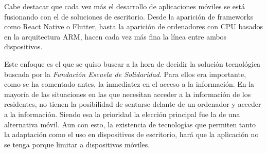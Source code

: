 Cabe destacar que cada vez más el desarrollo de aplicaciones móviles se está fusionando con el de soluciones de escritorio. Desde la aparición de frameworks como React Native o Flutter, hasta la aparición de ordenadores con CPU basados en la arquitectura ARM, hacen cada vez más fina la línea entre ambos dispositivos. 

Este enfoque es el que se quiso buscar a la hora de decidir la solución tecnológica buscada por la \textit{Fundación Escuela de Solidaridad}. Para ellos era importante, como se ha comentado antes, la inmediatez en el acceso a la información. En la mayoría de las situaciones en las que necesitan acceder a la información de los residentes, no tienen la posibilidad de sentarse delante de un ordenador y acceder a la información. Siendo esa la prioridad la elección principal fue la de una alternativa móvil. Aun con esto, la existencia de tecnologías que permiten tanto la adaptación como el uso en dispositivos de escritorio, hará que la aplicación no se tenga porque limitar a dispositivos móviles.